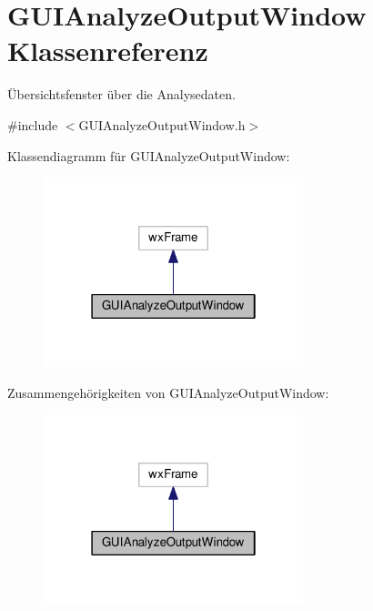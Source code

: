 \hypertarget{classGUIAnalyzeOutputWindow}{\section{G\-U\-I\-Analyze\-Output\-Window Klassenreferenz}
\label{classGUIAnalyzeOutputWindow}
}


Übersichtsfenster über die Analysedaten.  




{\ttfamily \#include $<$G\-U\-I\-Analyze\-Output\-Window.\-h$>$}



Klassendiagramm für G\-U\-I\-Analyze\-Output\-Window\-:
\nopagebreak
\begin{figure}[H]
\begin{center}
\leavevmode
\includegraphics[width=214pt]{classGUIAnalyzeOutputWindow__inherit__graph}
\end{center}
\end{figure}


Zusammengehörigkeiten von G\-U\-I\-Analyze\-Output\-Window\-:
\nopagebreak
\begin{figure}[H]
\begin{center}
\leavevmode
\includegraphics[width=214pt]{classGUIAnalyzeOutputWindow__coll__graph}
\end{center}
\end{figure}
